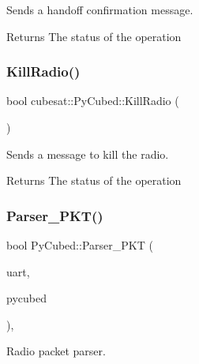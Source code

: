 Sends a handoff confirmation message. 

\begin{DoxyReturn}{Returns}
The status of the operation 
\end{DoxyReturn}
\mbox{\label{classcubesat_1_1PyCubed_a1156a3504ba2c8ad1f7b6622ff9f286c}} 
\subsubsection{\texorpdfstring{Kill\+Radio()}{KillRadio()}}
{\footnotesize\ttfamily bool cubesat\+::\+Py\+Cubed\+::\+Kill\+Radio (\begin{DoxyParamCaption}{ }\end{DoxyParamCaption})\hspace{0.3cm}{\ttfamily [inline]}}



Sends a message to kill the radio. 

\begin{DoxyReturn}{Returns}
The status of the operation 
\end{DoxyReturn}
\mbox{\label{classcubesat_1_1PyCubed_ac58a739fdf572f272776164304dc951f}} 
\subsubsection{\texorpdfstring{Parser\+\_\+\+P\+K\+T()}{Parser\_PKT()}}
{\footnotesize\ttfamily bool Py\+Cubed\+::\+Parser\+\_\+\+P\+KT (\begin{DoxyParamCaption}\item[{\hyperlink{classcubesat_1_1UARTDevice}{U\+A\+R\+T\+Device} \&}]{uart,  }\item[{\hyperlink{classcubesat_1_1PyCubed}{Py\+Cubed} \&}]{pycubed }\end{DoxyParamCaption})\hspace{0.3cm}{\ttfamily [static]}, {\ttfamily [private]}}



Radio packet parser. 

\mbox{\label{classcubesat_1_1PyCubed_a60887bc5d94a8f58ac1d59db50397268}} 
